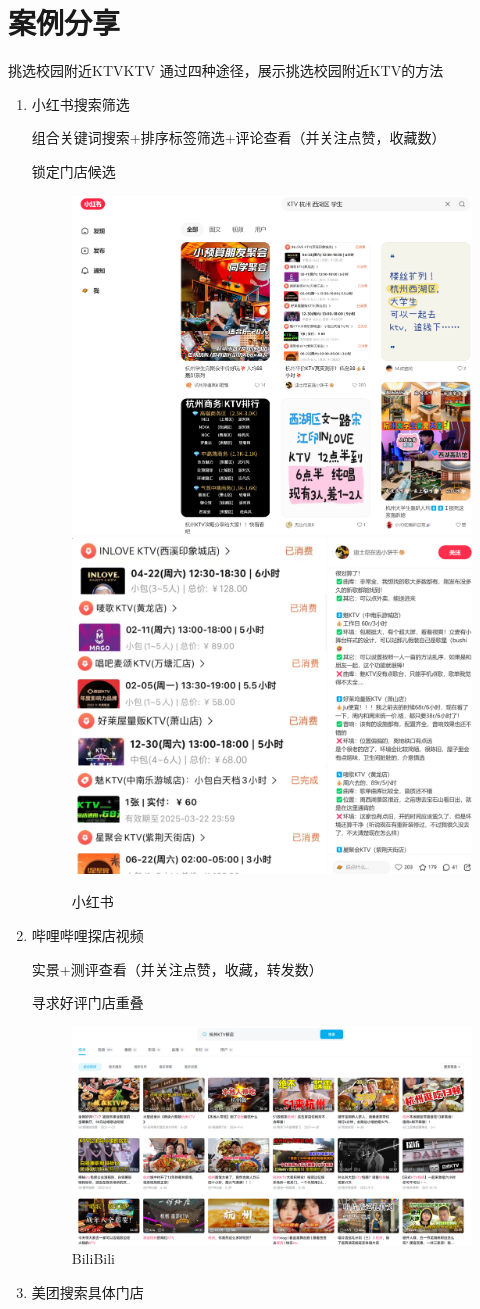 \documentclass{amznotes}
\begin{document}
\section{案例分享}
\begin{exbox}{挑选校园附近KTV}{KTV}
  通过四种途径，展示挑选校园附近KTV的方法
  \tcblower
  \begin{enumerate}
    \item 小红书搜索筛选

    组合关键词搜索+排序标签筛选+评论查看（并关注点赞，收藏数）

    锁定门店候选
    \begin{figure}[H]
      \centering
      \includegraphics[width=.4\textwidth]{./figures/生活/ktv/1.png}
      \qquad
      \includegraphics[width=.4\textwidth]{./figures/生活/ktv/2.png}
      \caption{小红书}
    \end{figure}

  \item 哔哩哔哩探店视频

  实景+测评查看（并关注点赞，收藏，转发数）

  寻求好评门店重叠

  \begin{figure}[H]
    \centering
    \includegraphics[width=.8\textwidth]{./figures/生活/ktv/bili.png}
    \caption{BiliBili}
  \end{figure}
  \item 美团搜索具体门店


\end{enumerate}
\end{exbox}
\end{document}
